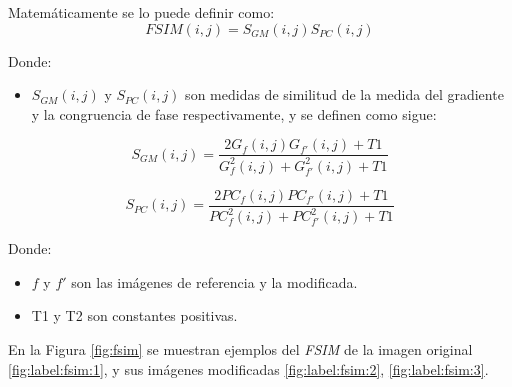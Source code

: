 

Matemáticamente se lo puede definir como:
\begin{equation}\label{eq:fsim}
FSIM (i,j) = S_{GM}(i,j) S_{PC}(i,j)
\end{equation}

Donde: 
\begin{itemize}
\item $S_{GM}(i,j)$ y  $S_{PC}(i,j)$ son medidas de similitud de la medida del gradiente y la congruencia de fase respectivamente, y se definen como sigue:
\end{itemize}

\begin{equation}\label{eq:sgm}
S_{GM}(i,j) = \frac{2G_f(i,j)G_{f'}(i,j)+T1}{G_{f}^{2}(i,j) + G_{f'}^{2}(i,j)+T1}
\end{equation}

\begin{equation}\label{eq:spc}
S_{PC}(i,j) = \frac{2PC_f(i,j)PC_{f'}(i,j)+T1}{PC_{f}^{2}(i,j) + PC_{f'}^{2}(i,j)+T1}
\end{equation}

Donde: 
\begin{itemize}
\item $f$ y $f'$ son las imágenes de referencia y la modificada.
\item T1 y T2 son constantes positivas.
\end{itemize}

En la Figura \ref{fig:fsim} se muestran ejemplos del \textit{FSIM} de la imagen original \ref{fig:label:fsim:1}, y sus imágenes modificadas \ref{fig:label:fsim:2}, \ref{fig:label:fsim:3}.


